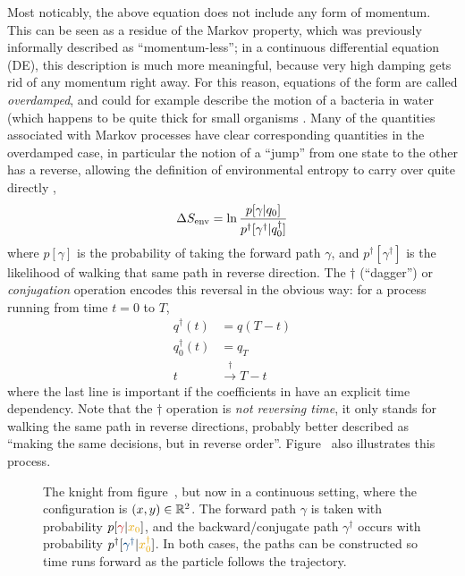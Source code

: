 Most noticably, the above equation does not include any form of momentum. This can be seen as a residue of the Markov property, which was previously informally described as ``momentum-less''; in a continuous differential equation (DE), this description is much more meaningful, because very high damping gets rid of any momentum right away. For this reason, equations of the form  are called \emph{overdamped}, and could for example describe the motion of a bacteria in water (which happens to be quite thick for small organisms \cite{sengupta}. Many of the quantities associated with Markov processes have clear corresponding quantities in the overdamped case, in particular the notion of a ``jump'' from one state to the other has a reverse, allowing the definition of environmental entropy to carry over quite directly ,
%
\begin{equation}
	\Delta S_\text{env} = \ln\frac{p[\gamma | q_0]}{p^\dagger[\gamma^\dagger | q_0^\dagger]}
\end{equation}
%
where \(p[\gamma]\) is the probability of taking the forward path \(\gamma\), and \(p^\dagger[\gamma^\dagger]\) is the likelihood of walking that same path in reverse direction. The \(\dagger\) (``dagger'') or \emph{conjugation} operation encodes this reversal in the obvious way: for a process running from time \(t=0\) to \(T\),
%
\begin{equation}
	\begin{split}
		q^\dagger(t) &= q(T-t) \\
		q_0^\dagger(t) &= q_T \\
		t &\overset\dagger\rightarrow T-t
	\end{split}
\end{equation}
%
where the last line is important if the coefficients in  have an explicit time dependency. Note that the \(\dagger\) operation is \emph{not reversing time}, it only stands for walking the same path in reverse directions, probably better described as ``making the same decisions, but in reverse order''. Figure~ also illustrates this process.

\begin{figure}[htbp]
	\centering
	
	\caption[]{
		The knight from figure~, but now in a continuous setting, where the configuration is \((x,y)\in\mathbb{R}^2\). The {\color{red}forward path \(\gamma\)} is taken with probability \(p[{\color{red}\gamma}|{\color{yellow}x_0}]\), and the {\color{blue}backward/conjugate path \(\gamma^\dagger\)} occurs with probability \(p^\dagger[{\color{blue}\gamma^\dagger}|{\color{yellow}x_0^\dagger}]\). In both cases, the paths can be constructed so time runs forward as the particle follows the trajectory.
	}
	\label{fig:knight continuous}
\end{figure}


